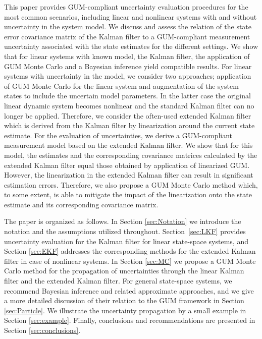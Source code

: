 \documentclass[10pt]{article}
\begin{document}
\begin{spacing}{1}
This paper provides GUM-compliant uncertainty evaluation procedures for the most common scenarios, including linear and nonlinear systems with and without uncertainty in the system model. We discuss and assess the relation of the state error covariance matrix of the Kalman filter to a GUM-compliant measurement uncertainty associated with the state estimates for the different settings. We show that for linear systems with known model, the Kalman filter, the application of GUM Monte Carlo and a Bayesian inference yield compatible results. For linear systems with uncertainty in the model, we consider two approaches; application of GUM Monte Carlo for the linear system and augmentation of the system states to include the uncertain model parameters. In the latter case the original linear dynamic system becomes nonlinear and the standard Kalman filter can no longer be applied. Therefore, we consider the often-used extended Kalman filter which is derived from the Kalman filter by linearization around the current state estimate. For the evaluation of uncertainties, we derive a GUM-compliant measurement model based on the extended Kalman filter. We show that for this model, the estimates and the corresponding covariance matrices calculated by the extended Kalman filter equal those obtained by application of linearized GUM. However, the linearization in the extended Kalman filter can result in significant estimation errors. Therefore, we also propose a GUM Monte Carlo method which, to some extent, is able to mitigate the impact of the linearization onto the state estimate and its corresponding covariance matrix.

The paper is organized as follows. In Section \ref{sec:Notation} we introduce the notation and the assumptions utilized throughout. Section~\ref{sec:LKF} provides uncertainty evaluation for the Kalman filter for linear state-space systems, and Section \ref{sec:EKF} addresses the corresponding methods for the extended Kalman filter in case of nonlinear systems. In Section \ref{sec:MC} we propose a GUM Monte Carlo method for the propagation of uncertainties through the linear Kalman filter and the extended Kalman filter. For general state-space systems, we recommend Bayesian inference and related approximate approaches, and we give a more detailed discussion of their relation to the GUM framework in Section \ref{sec:Particle}. We illustrate the uncertainty propagation by a small  example in Section \ref{sec:example}. Finally, conclusions and recommendations are presented in Section \ref{sec:conclusions}.




\end{spacing}
\end{document}
